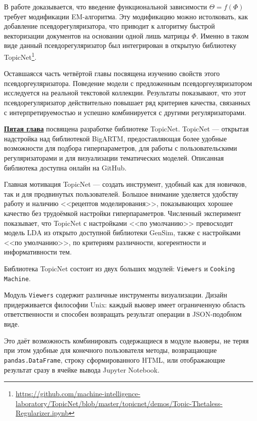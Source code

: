 В работе \cite{thetaless} доказывается, что введение функциональной зависимости $\Theta = f(\Phi)$ требует модификации EM-алгоритма. Эту модификацию можно истолковать, как добавление псевдорегуляризатора, что приводит к алгоритму быстрой векторизации документов на основании одной лишь матрицы $\Phi$. Именно в таком виде данный псевдорегуляризатор был интегрирован в открытую библиотеку TopicNet\footnote{\url{https://github.com/machine-intelligence-laboratory/TopicNet/blob/master/topicnet/demos/Topic-Thetaless-Regularizer.ipynb}}. 

Оставшаясся часть четвёртой главы посвящена изучению свойств этого псевдоргеуляризатора. Поведение модели с предложенным псевдоргеуляризатором исследуется на реальной текстовой коллекции. Результаты показывают, что этот псевдорегуляризатор действительно повышает ряд критериев качества, связанных с интерпретируемостью и успешно комбинируется с другими регуляризаторами.

\underline{\textbf{Пятая глава}} посвящена разработке библиотеке TopicNet. TopicNet --- открытая надстройка над библиотекой BigARTM, предоставляющая более удобные возможности для подбора гиперпараметров, для работы с пользовательскими регуляризаторами и для визуализации тематических моделей. Описанная библиотека доступна онлайн на GitHub.

Главная мотивация TopicNet --- создать инструмент, удобный как для новичков, так и для продвинутых пользователей. Большое внимание уделяется удобству работу и наличию <<рецептов моделирования>>, показывающих хорошее качество без трудоёмкой настройки гиперпараметров. Численный эксперимент показывает, что TopicNet с настройками <<по умолчанию>> превосходит модель LDA из открыто доступной библиотеки GenSim, также с настройками <<по умолчанию>>, по критериям различности, когерентности и информативности тем.

Библиотека TopicNet состоит из двух больших модулей: \texttt{Viewers} и \texttt{Cooking Machine}.  

Модуль \texttt{Viewers} содержит различные инструменты визуализации. Дизайн придерживается философии Unix: каждый вьювер имеет ограниченную область ответственности и способен возвращать результат операции в JSON-подобном виде.

Это даёт возможность комбинировать содержащиеся в модуле вьюверы, не теряя при этом удобные для конечного пользователя методы, возвращающие \texttt{pandas.DataFrame}, строку сформированного HTML, или отображающие результат сразу в ячейке вывода Jupyter Notebook. 

